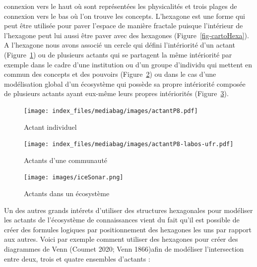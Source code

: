 \documentclass[
  letterpaper,
  DIV=11,
  numbers=noendperiod]{scrreprt}
\begin{document}
connexion vers le haut où sont représentées les physicalités et trois
plages de connexion vers le bas où l'on trouve les concepts. L'hexagone
est une forme qui peut être utilisée pour paver l'espace de manière
fractale puisque l'intérieur de l'hexagone peut lui aussi être paver
avec des hexagones (Figure~\ref{fig-cartoHexa}). A l'hexagone nous avons
associé un cercle qui défini l'intériorité d'un actant
(Figure~\ref{fig-actantP8}) ou de plusieurs actants qui se partagent la
même intériorité par exemple dans le cadre d'une institution ou d'un
groupe d'individu qui mettent en commun des concepts et des pouvoirs
(Figure~\ref{fig-actantP8-membres}) ou dans le cas d'une modélisation
global d'un écosystème qui possède sa propre intériorité composée de
plusieurs actants ayant eux-même leurs propres intériorités
(Figure~\ref{fig-actantSonar}).

\begin{figure}

{\centering \texttt{[image: index\_files/mediabag/images/actantP8.pdf]}

}

\caption{\label{fig-actantP8}Actant individuel}

\end{figure}

\begin{figure}

{\centering \texttt{[image: index\_files/mediabag/images/actantP8-labos-ufr.pdf]}

}

\caption{\label{fig-actantP8-membres}Actants d'une communauté}

\end{figure}

\begin{figure}

{\centering \texttt{[image: images/iceSonar.png]}

}

\caption{\label{fig-actantSonar}Actants dans un écosystème}

\end{figure}

Un des autres grands intérets d'utiliser des structures hexagonales pour
modéliser les actants de l'écosystème de connaissances vient du fait
qu'il est possible de créer des formules logiques par positionnement des
hexagones les uns par rapport aux autres. Voici par exemple comment
utiliser des hexagones pour créer des diagrammes de Venn (Coumet 2020;
Venn 1866)afin de modéliser l'intersection entre deux, trois et quatre
ensembles d'actants :
\end{document}
